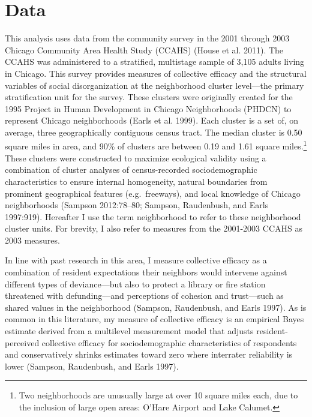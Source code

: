 \documentclass [11pt, proquest] {uwthesis}[2015/03/03]
\begin{document}
\hypertarget{data}{%
\section{Data}\label{data}}

This analysis uses data from the community survey in the 2001 through 2003 Chicago Community Area Health Study (CCAHS) (House et al. 2011). The CCAHS was administered to a stratified, multistage sample of 3,105 adults living in Chicago. This survey provides measures of collective efficacy and the structural variables of social disorganization at the neighborhood cluster level---the primary stratification unit for the survey. These clusters were originally created for the 1995 Project in Human Development in Chicago Neighborhoods (PHDCN) to represent Chicago neighborhoods (Earls et al. 1999). Each cluster is a set of, on average, three geographically contiguous census tract. The median cluster is 0.50 square miles in area, and 90\% of clusters are between 0.19 and 1.61 square miles.\footnote{Two neighborhoods are unusually large at over 10 square miles each, due to the inclusion of large open areas: O'Hare Airport and Lake Calumet.} These clusters were constructed to maximize ecological validity using a combination of cluster analyses of census-recorded sociodemographic characteristics to ensure internal homogeneity, natural boundaries from prominent geographical features (e.g.~freeways), and local knowledge of Chicago neighborhoods (Sampson 2012:78--80; Sampson, Raudenbush, and Earls 1997:919). Hereafter I use the term neighborhood to refer to these neighborhood cluster units. For brevity, I also refer to measures from the 2001-2003 CCAHS as 2003 measures.

In line with past research in this area, I measure collective efficacy as a combination of resident expectations their neighbors would intervene against different types of deviance---but also to protect a library or fire station threatened with defunding---and perceptions of cohesion and trust---such as shared values in the neighborhood (Sampson, Raudenbush, and Earls 1997). As is common in this literature, my measure of collective efficacy is an empirical Bayes estimate derived from a multilevel measurement model that adjusts resident-perceived collective efficacy for sociodemographic characteristics of respondents and conservatively shrinks estimates toward zero where interrater reliability is lower (Sampson, Raudenbush, and Earls 1997).
\end{document}
